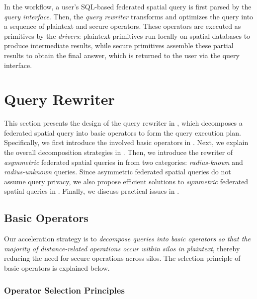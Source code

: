 In the workflow, a user's SQL-based federated spatial query is first parsed by the \textit{query interface}. 
Then, the \textit{query rewriter} transforms and optimizes the query into a sequence of plaintext and secure operators.
These operators are executed as primitives by the \textit{drivers}: plaintext primitives run locally on spatial databases to produce intermediate results,
while secure primitives assemble these partial results to obtain the final answer, which is returned to the user via the query interface.

\section{Query Rewriter}
\label{sec:rewriter}

This section presents the design of the query rewriter in \sysname, which decomposes a federated spatial query into basic operators to form the query execution plan.
Specifically, we first introduce the involved basic operators in .
Next, we explain the overall decomposition strategies in .
Then, we introduce the rewriter of \textit{asymmetric} federated spatial queries in  from two categories: \textit{radius-known} and \textit{radius-unknown} queries.
Since asymmetric federated spatial queries do not assume query privacy,
we also propose efficient solutions to \textit{symmetric} federated spatial queries in .
Finally, we discuss practical issues in .

\subsection{Basic Operators}
\label{sec:basic-operators}

Our acceleration strategy is to \textit{decompose queries into basic operators so that the majority of distance-related operations occur within silos in plaintext}, thereby reducing the need for secure operations across silos.
The selection principle of basic operators is explained below.

\subsubsection{Operator Selection Principles}
\label{sec:basic-principles}

